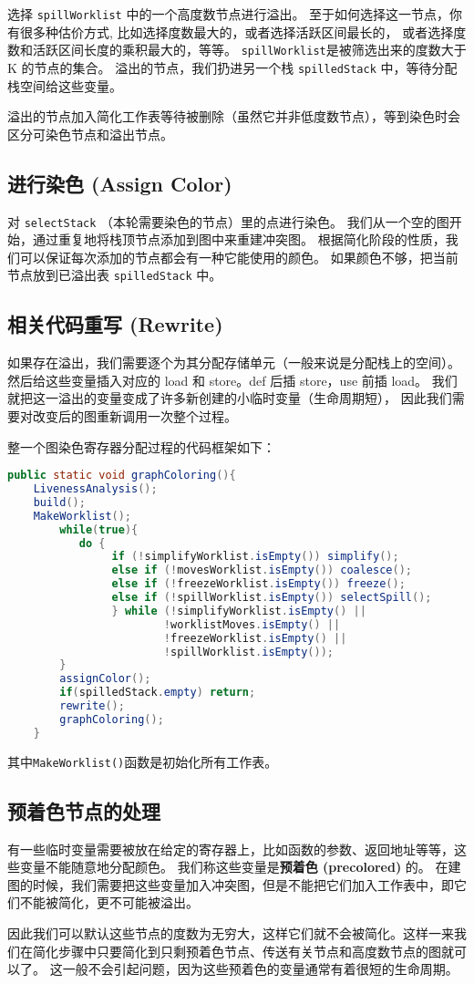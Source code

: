 选择 \texttt{spillWorklist} 中的一个高度数节点进行溢出。
至于如何选择这一节点，你有很多种估价方式, 比如选择度数最大的，或者选择活跃区间最长的，
或者选择度数和活跃区间长度的乘积最大的，等等。
\texttt{spillWorklist}是被筛选出来的度数大于 K 的节点的集合。
溢出的节点，我们扔进另一个栈 \texttt{spilledStack} 中，等待分配栈空间给这些变量。

溢出的节点加入简化工作表等待被删除（虽然它并非低度数节点），等到染色时会区分可染色节点和溢出节点。

\subsection{进行染色 (Assign Color)}

对 \texttt{selectStack} （本轮需要染色的节点）里的点进行染色。
我们从一个空的图开始，通过重复地将栈顶节点添加到图中来重建冲突图。
根据简化阶段的性质，我们可以保证每次添加的节点都会有一种它能使用的颜色。
如果颜色不够，把当前节点放到已溢出表 \texttt{spilledStack} 中。

\subsection{相关代码重写 (Rewrite)}

如果存在溢出，我们需要逐个为其分配存储单元（一般来说是分配栈上的空间）。
然后给这些变量插入对应的 load 和 store。def 后插 store，use 前插 load。
我们就把这一溢出的变量变成了许多新创建的小临时变量（生命周期短），
因此我们需要对改变后的图重新调用一次整个过程。

整一个图染色寄存器分配过程的代码框架如下：
\begin{lstlisting}[language=java]
    public static void graphColoring(){
    LivenessAnalysis();    
    build();
    MakeWorklist();
        while(true){
           do {
                if (!simplifyWorklist.isEmpty()) simplify();
                else if (!movesWorklist.isEmpty()) coalesce();
                else if (!freezeWorklist.isEmpty()) freeze();
                else if (!spillWorklist.isEmpty()) selectSpill();
                } while (!simplifyWorklist.isEmpty() ||
                        !worklistMoves.isEmpty() ||
                        !freezeWorklist.isEmpty() ||
                        !spillWorklist.isEmpty());
        }
        assignColor();
        if(spilledStack.empty) return;
        rewrite();
        graphColoring();
    }
\end{lstlisting}

其中\texttt{MakeWorklist()}函数是初始化所有工作表。

\subsection{预着色节点的处理}

有一些临时变量需要被放在给定的寄存器上，比如函数的参数、返回地址等等，这些变量不能随意地分配颜色。
我们称这些变量是\textbf{预着色 (precolored)} 的。
在建图的时候，我们需要把这些变量加入冲突图，但是不能把它们加入工作表中，即它们不能被简化，更不可能被溢出。

因此我们可以默认这些节点的度数为无穷大，这样它们就不会被简化。这样一来我们在简化步骤中只要简化到只剩预着色节点、传送有关节点和高度数节点的图就可以了。
这一般不会引起问题，因为这些预着色的变量通常有着很短的生命周期。
